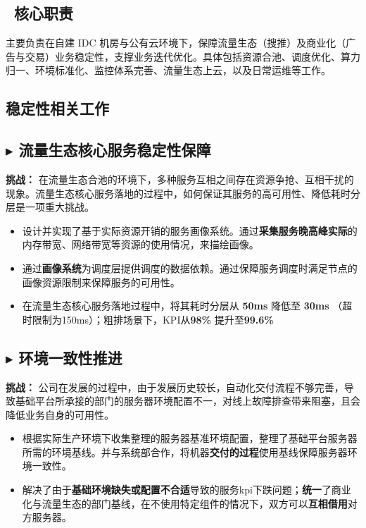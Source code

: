 \documentclass{resume}
\begin{document}
\subsection{\Large \faBullseye\ \textbf{核心职责}}
主要负责在自建 IDC 机房与公有云环境下，保障流量生态（搜推）及商业化（广告与交易）业务稳定性，支撑业务迭代优化。具体包括资源合池、调度优化、算力归一、环境标准化、监控体系完善、流量生态上云，以及日常运维等工作。
\vspace{5pt}
\begin{onehalfspacing}
\subsection{\large \faShield \textbf{稳定性相关工作}}
\subsection{\textbf{$\blacktriangleright$ 流量生态核心服务稳定性保障}}
\textbf{挑战：} 在流量生态合池的环境下，多种服务互相之间存在资源争抢、互相干扰的现象。流量生态核心服务落地的过程中，如何保证其服务的高可用性、降低耗时分层是一项重大挑战。
\begin{itemize}
  \item 设计并实现了基于实际资源开销的服务画像系统。通过\textbf{采集服务晚高峰实际}的内存带宽、网络带宽等资源的使用情况，来描绘画像。
  \item 通过\textbf{画像系统}为调度层提供调度的数据依赖。通过保障服务调度时满足节点的画像资源限制来保障服务的可用性。
  \item 在流量生态核心服务落地过程中，将其耗时分层从\textbf{ 50ms }降低至\textbf{ 30ms }（超时限制为150ms）；粗排场景下，KPI从\textbf{98\%} 提升至\textbf{99.6\%}
\end{itemize}
\subsection{\textbf{$\blacktriangleright$ 环境一致性推进}}
\textbf{挑战：} 公司在发展的过程中，由于发展历史较长，自动化交付流程不够完善，导致基础平台所承接的部门的服务器环境配置不一，对线上故障排查带来阻塞，且会降低业务自身的可用性。
\begin{itemize}
  \item 根据实际生产环境下收集整理的服务器基准环境配置，整理了基础平台服务器所需的环境基线。并与系统部合作，将机器\textbf{交付的过程}使用基线保障服务器环境一致性。
  \item 解决了由于\textbf{基础环境缺失或配置不合适}导致的服务kpi下跌问题；\textbf{统一}了商业化与流量生态的部门基线，在不使用特定组件的情况下，双方可以\textbf{互相借用}对方服务器。
\end{itemize}


\end{onehalfspacing}
\end{document}
